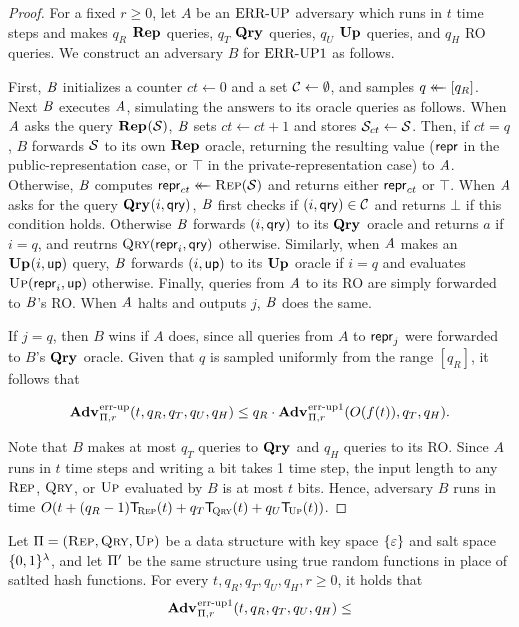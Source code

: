 \begin{proof}For a fixed $r \ge 0$, let $A$ be an $\textnormal{ERR\mbox{-}UP}$ adversary which runs in $t$ time steps and makes $q_R$ $\mathbf{Rep}\hspace{0.5pt}$ queries, $q_T$ $\mathbf{Qry}\hspace{0.5pt}$ queries, $q_U$ $\mathbf{Up}\hspace{0.5pt}$ queries, and $q_H$ RO queries. We construct an adversary $B$ for $\textnormal{ERR\mbox{-}UP}1$ as follows.

First, $\mathit{B}$ initializes a counter $ct \gets 0$ and a set $\mathcal{C} \gets \emptyset$, and samples $q \mathrel{\leftarrow\mkern-14mu\leftarrow} [q_R]$. Next $\mathit{B}$ executes $\mathit{A}$, simulating the answers to its oracle queries as follows. When $\mathit{A}$ asks the query $\mathbf{Rep}\hspace{0.5pt}(\mathcal{S})$, $\mathit{B}$ sets $ct \gets ct + 1$ and stores $\mathcal{S}_{ct} \gets \mathcal{S}$. Then, if $ct = q$, $B$ forwards $\mathcal{S}$ to its own $\mathbf{Rep}\hspace{0.5pt}$ oracle, returning the resulting value ($\mathsf{repr}$ in the public-representation case, or $\top$ in the private-representation case) to $\mathit{A}$. Otherwise, $\mathit{B}$ computes $\mathsf{repr}_{ct} \mathrel{\leftarrow\mkern-14mu\leftarrow} \textsc{Rep}(\mathcal{S})$ and returns either $\mathsf{repr}_{ct}$ or $\top$. When $\mathit{A}$ asks for the query $\mathbf{Qry}\hspace{0.5pt}(i,\mathsf{qry})$, $\mathit{B}$ first checks if $(i,\mathsf{qry}) \in \mathcal{C}$ and returns $\bot$ if this condition holds. Otherwise $\mathit{B}$ forwards $(i,\mathsf{qry})$ to its $\mathbf{Qry}\hspace{0.5pt}$ oracle and returns $a$ if $i = q$, and reutrns $\textsc{Qry}(\mathsf{repr}_i,\mathsf{qry})$ otherwise. Similarly, when $\mathit{A}$ makes an $\mathbf{Up}\hspace{0.5pt}(i,\mathsf{up})$ query, $\mathit{B}$ forwards $(i,\mathsf{up})$ to its $\mathbf{Up}\hspace{0.5pt}$ oracle if $i = q$ and evaluates $\textsc{Up}(\mathsf{repr}_i,\mathsf{up})$ otherwise. Finally, queries from $\mathit{A}$ to its RO are simply forwarded to $\mathit{B}$'s RO. When $\mathit{A}$ halts and outputs $j$, $\mathit{B}$ does the same.

If $j = q$, then $B$ wins if $A$ does, since all queries from $A$ to $\mathsf{repr}_j$ were forwarded to $B$'s $\mathbf{Qry}\hspace{0.5pt}$ oracle. Given that $q$ is sampled uniformly from the range $[q_R]$, it follows that

$$\Adv{\errep}_{\struct,r}(t, q_R, q_T, q_U, q_H) \leq q_R\cdot\Adv{\errep1}_{\struct,r}(O(f(t)), q_T, q_H).$$

Note that $B$ makes at most $q_T$ queries to $\mathbf{Qry}\hspace{0.5pt}$ and $q_H$ queries to its RO. Since $A$ runs in $t$ time steps and writing a bit takes 1 time step, the input length to any $\textsc{Rep}$, $\textsc{Qry}$, or $\textsc{Up}$ evaluated by $B$ is at most $t$ bits. Hence, adversary $B$ runs in time $O(t+(q_R-1)\ticks(\Rep,t)+q_T\ticks(\Qry,t)+q_U\ticks(\Up,t))$.\missingqed
\end{proof}

\begin{lemma}\label{lemma:salttorand}
  Let $\mathrm{\Pi} = (\textsc{Rep}, \textsc{Qry}, \textsc{Up})$ be a data structure with key space $\{\varepsilon\}$ and salt space $\{0,1\}^\lambda$, and let $\mathrm{\Pi}'$ be the same structure using true random functions in place of satlted hash functions. For every $t, q_R, q_T, q_U, q_H, r \geq 0$, it holds that
  \[
    \Adv{\errep1}_{\struct,r}(t, q_R, q_T, q_U, q_H) \leq
  \]
\end{lemma}

